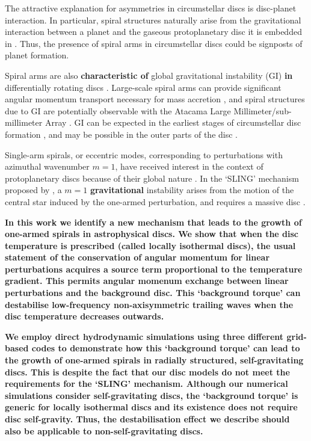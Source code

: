 \documentclass[useAMS,usenatbib]{mn2e}
\begin{document}
The attractive explanation for asymmetries in circumstellar discs is
disc-planet interaction. In particular, spiral structures  
naturally arise from the gravitational interaction between a
planet and the gaseous protoplanetary disc it is embedded in
\citep[see, e.g.][for a recent review]{baruteau13b}. Thus, the
presence of spiral arms in circumstellar discs could be signposts of 
planet formation.  

Spiral arms are also {\bf characteristic of} global gravitational 
instability (GI) {\bf in} differentially rotating discs
\citep{goldreich65,laughlin96b,laughlin98,nelson98,lodato05,forgan11}. Large-scale 
spiral arms can provide significant angular momentum transport
necessary for mass accretion \citep{lynden-bell72,
  papaloizou91,balbus99,lodato04}, and spiral structures due to GI are
potentially observable with the Atacama Large
Millimeter/sub-millimeter Array \citep{cossins10,dipierror14}. GI can
be expected in the earliest stages of circumstellar disc formation 
\citep{kratter10b,inutsuka10,tsukamoto13}, and may be possible in the
outer parts of the disc \citep{rafikov05,matzner05,kimura12}.  

Single-arm spirals, or eccentric modes, corresponding to perturbations 
with azimuthal wavenumber $m=1$, have received interest in 
the context of protoplanetary discs because of their global nature
\citep{adams89,heemskerk92,laughlin96,tremaine01,papaloizou02,hopkins10}. 
In the `SLING' mechanism proposed by \cite{shu90}, a $m=1$ {\bf
  gravitational} instability arises from the motion of the
central star induced by the one-armed perturbation, and requires a
massive disc \citep[the former may have observable consequences,
][]{michael10}.    

{\bf
  In this work we identify a new mechanism that leads to the growth of
  one-armed spirals in astrophysical discs. We show
  that when the disc temperature is prescribed (called locally isothermal
  discs), the usual statement of the conservation of angular momentum
  for linear perturbations acquires a source term proportional to the
  temperature gradient. This permits angular momenum exchange between
  linear perturbations and the background disc. This `background
  torque' can destabilise low-frequency non-axisymmetric
  trailing waves when the disc temperature decreases outwards.       
}  

{\bf We employ direct hydrodynamic simulations using three different
  grid-based codes to demonstrate how this `background torque' 
  can lead to the growth of one-armed spirals in radially structured, 
  self-gravitating discs. This is despite the fact that our disc
  models do not meet the requirements for the `SLING' 
  mechanism. Although our numerical simulations consider
  self-gravitating discs, the `background torque' is generic for
  locally isothermal discs and its existence does not require
  disc self-gravity. Thus, the destabilisation effect we
  describe should also be applicable to non-self-gravitating discs.  
}
\end{document}
